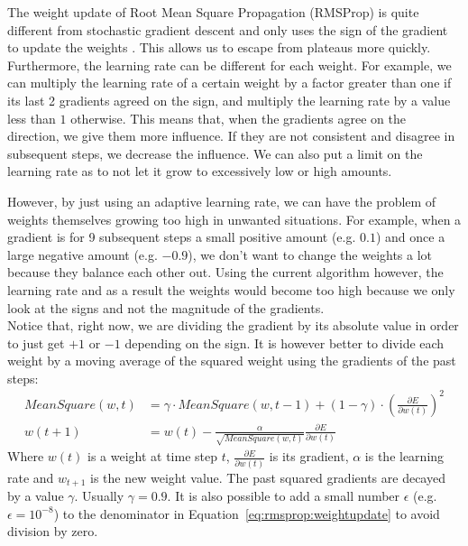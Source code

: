 The weight update of Root Mean Square Propagation (RMSProp) is quite different from stochastic gradient descent and only uses the sign of the gradient to update the weights \parencite{Tieleman2012LectureMagnitude.}.
This allows us to escape from plateaus more quickly. Furthermore, the learning rate can be different for each weight.
For example, we can multiply the learning rate of a certain weight by a factor greater than one if its last 2 gradients agreed on the sign, and multiply the learning rate by a value less than $1$ otherwise.
This means that, when the gradients agree on the direction, we give them more influence. If they are not consistent and disagree in subsequent steps, we decrease the influence. We can also put a limit on the learning rate as to not let it grow to excessively low or high amounts.

However, by just using an adaptive learning rate, we can have the problem of weights themselves growing too high in unwanted situations. For example, when a gradient is for 9 subsequent steps a small positive amount (e.g. $0.1$) and once a large negative amount (e.g. $-0.9$), we don't want to change the weights a lot because they balance each other out.
Using the current algorithm however, the learning rate and as a result the weights would become too high because we only look at the signs and not the magnitude of the gradients.\\
Notice that, right now, we are dividing the gradient by its absolute value in order to just get $+1$ or $-1$ depending on the sign. It is however better to divide each weight by a moving average of the squared weight using the gradients of the past steps:
\begin{subequations}
\label{eq:rmsprop}
\begin{align}
MeanSquare(w, t) &= \gamma \cdot MeanSquare(w, t-1) + (1 - \gamma) \cdot \left (\frac{\partial E}{\partial w(t)} \right )^2 \\
w(t+1) &= w(t) - \frac{\alpha}{\sqrt{MeanSquare(w,t)}}\frac{\partial E}{\partial w(t)} \label{eq:rmsprop:weightupdate}
\end{align}
\end{subequations}
Where $w(t)$ is a weight at time step $t$, $\frac{\partial E}{\partial w(t)}$ is its gradient, $\alpha$ is the learning rate and $w_{t+1}$ is the new weight value. The past squared gradients are decayed by a value $\gamma$. Usually $\gamma=0.9$. It is also possible to add a small number $\epsilon$ (e.g. $\epsilon = 10^{-8}$) to the denominator in Equation~\ref{eq:rmsprop:weightupdate} to avoid division by zero.\\


